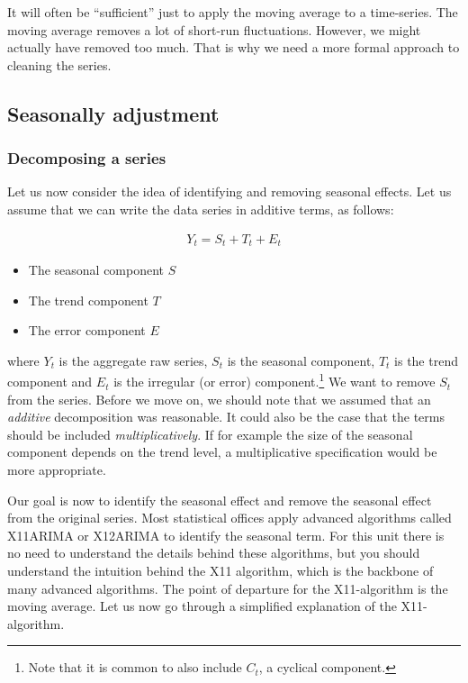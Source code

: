 \documentclass[]{book}
\providecommand{\tightlist}{%
  \setlength{\itemsep}{0pt}\setlength{\parskip}{0pt}}
\let\rmarkdownfootnote\footnote%
\def\footnote{\protect\rmarkdownfootnote}
\begin{document}
It will often be ``sufficient'' just to apply the moving average to a time-series. The moving average removes a lot of short-run fluctuations. However, we might actually have removed too much. That is why we need a more formal approach to cleaning the series.

\hypertarget{seasonally-adjustment}{%
\subsection{Seasonally adjustment}\label{seasonally-adjustment}}

\hypertarget{decomposing-a-series}{%
\subsubsection*{Decomposing a series}\label{decomposing-a-series}}

Let us now consider the idea of identifying and removing seasonal effects. Let us assume that we can write the data series in additive terms, as follows:

\begin{align}
  Y_t=S_t+T_t+E_t
\end{align}

\begin{itemize}
\tightlist
\item
  The seasonal component \(S\)
\item
  The trend component \(T\)
\item
  The error component \(E\)
\end{itemize}

where \(Y_t\) is the aggregate raw series, \(S_t\) is the seasonal component, \(T_t\) is the trend component and \(E_t\) is the irregular (or error) component.\footnote{Note that it is common to also include \(C_t\), a cyclical component.} We want to remove \(S_t\) from the series. Before we move on, we should note that we assumed that an \emph{additive} decomposition was reasonable. It could also be the case that the terms should be included \emph{multiplicatively}. If for example the size of the seasonal component depends on the trend level, a multiplicative specification would be more appropriate.

Our goal is now to identify the seasonal effect and remove the seasonal effect from the original series. Most statistical offices apply advanced algorithms called X11ARIMA or X12ARIMA to identify the seasonal term. For this unit there is no need to understand the details behind these algorithms, but you should understand the intuition behind the X11 algorithm, which is the backbone of many advanced algorithms. The point of departure for the X11-algorithm is the moving average. Let us now go through a simplified explanation of the X11-algorithm.
\end{document}
